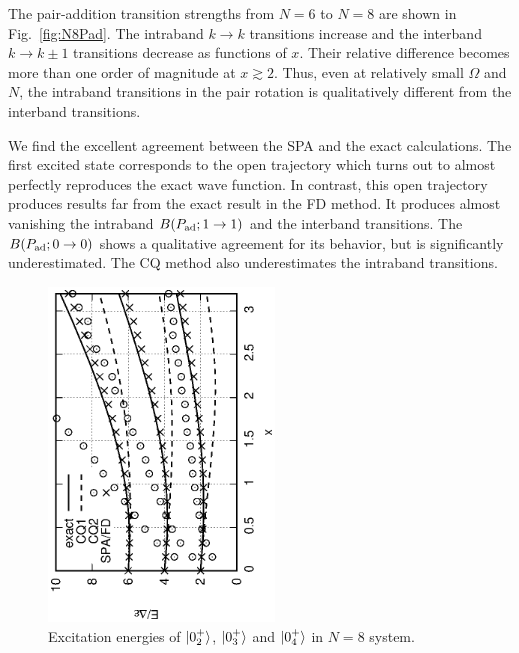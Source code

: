 \documentclass[%
superscriptaddress,
preprint,
showpacs,
nofootinbib,
amsmath,amssymb,
prc,
floatfix ]%
{revtex4-1}
\begin{document}
The pair-addition transition strengths from $N=6$ to $N=8$ are
shown in Fig.~\ref{fig:N8Pad}.
The intraband $k\rightarrow k$ transitions increase and 
the interband $k\rightarrow k\pm1$ transitions decrease as
functions of $x$.
Their relative difference becomes
more than one order of magnitude at $x\gtrsim 2$.
Thus, even at relatively small $\Omega$ and $N$,
the intraband transitions in the pair rotation is qualitatively different
from the interband transitions.

We find the excellent agreement between the SPA and the exact calculations.
The first excited state corresponds to the open trajectory which
turns out to almost perfectly reproduces the exact wave function.
In contrast, this open trajectory produces results far from the exact
result in the FD method.
It produces almost vanishing the intraband
$B(P_{\rm ad}; 1\rightarrow 1)$ and the interband transitions.
The $B(P_{\rm ad}; 0\rightarrow 0)$ shows a qualitative agreement for
its behavior, but is significantly underestimated.
The CQ method also underestimates the intraband transitions.


\begin{figure}[htbp]
 \begin{center}
  \includegraphics[width=60mm,angle=-90]{images/N8ex_energy2.eps}
 \end{center}
 \caption{Excitation energies of $\ket{0_2^+}$, $\ket{0_3^+}$ and $\ket{0_4^+}$ in $N=8$ system.}
 \label{fig:N8energy}
\end{figure}
\end{document}
